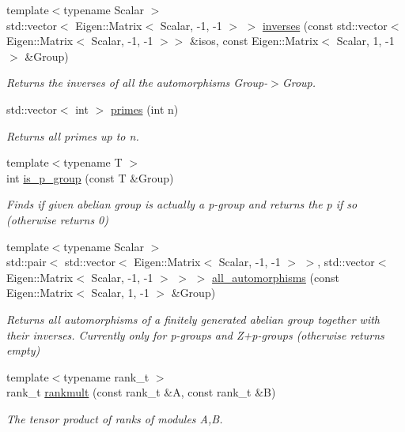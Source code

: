 \begin{DoxyCompactItemize}
{\footnotesize template$<$typename Scalar $>$ }\\std\+::vector$<$ Eigen\+::\+Matrix$<$ Scalar, -\/1, -\/1 $>$ $>$ \hyperlink{namespaceMackey_ac8552763cbbe02f22cedc11c6f8434da}{inverses} (const std\+::vector$<$ Eigen\+::\+Matrix$<$ Scalar, -\/1, -\/1 $>$$>$ \&isos, const Eigen\+::\+Matrix$<$ Scalar, 1, -\/1 $>$ \&Group)
\begin{DoxyCompactList}\small\item\em Returns the inverses of all the automorphisms Group-\/$>$Group. \end{DoxyCompactList}\item 
std\+::vector$<$ int $>$ \hyperlink{namespaceMackey_aa136aece9117704b3e5180d92484ed10}{primes} (int n)
\begin{DoxyCompactList}\small\item\em Returns all primes up to n. \end{DoxyCompactList}\item 
{\footnotesize template$<$typename T $>$ }\\int \hyperlink{namespaceMackey_a2b6ac22efe0be546f2c3f8abc2ceb5b7}{is\+\_\+p\+\_\+group} (const T \&Group)
\begin{DoxyCompactList}\small\item\em Finds if given abelian group is actually a p-\/group and returns the p if so (otherwise returns 0) \end{DoxyCompactList}\item 
{\footnotesize template$<$typename Scalar $>$ }\\std\+::pair$<$ std\+::vector$<$ Eigen\+::\+Matrix$<$ Scalar, -\/1, -\/1 $>$ $>$, std\+::vector$<$ Eigen\+::\+Matrix$<$ Scalar, -\/1, -\/1 $>$ $>$ $>$ \hyperlink{namespaceMackey_ac9020d176548a99b3119cd7bda15941d}{all\+\_\+automorphisms} (const Eigen\+::\+Matrix$<$ Scalar, 1, -\/1 $>$ \&Group)
\begin{DoxyCompactList}\small\item\em Returns all automorphisms of a finitely generated abelian group together with their inverses. Currently only for p-\/groups and Z+p-\/groups (otherwise returns empty) \end{DoxyCompactList}\item 
{\footnotesize template$<$typename rank\+\_\+t $>$ }\\rank\+\_\+t \hyperlink{namespaceMackey_aaa0ce7673970bf261628768fb11a1995}{rankmult} (const rank\+\_\+t \&A, const rank\+\_\+t \&B)
\begin{DoxyCompactList}\small\item\em The tensor product of ranks of modules A,B. \end{DoxyCompactList}\item 
$$
\end{DoxyCompactItemize}
